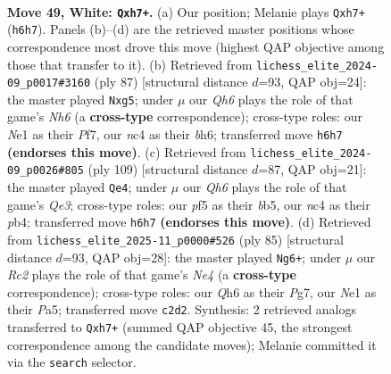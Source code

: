 \documentclass[11pt]{article}
\begin{document}
\clearpage

\begin{figure}[p]\centering
\begin{subfigure}{0.46\textwidth}\centering
\resizebox{\linewidth}{!}{%
\newchessgame
\chessboard[
  setfen={1qb5/r4k1p/4p2Q/p2pPpB1/P1n4P/3p4/2R5/RN2N1K1 w - - 1 49},
  showmover=false,
  pgfstyle=straightmove, color=movearrow, markmove={h6-h7}
]}
\caption{}
\end{subfigure}\hfill
\begin{subfigure}{0.46\textwidth}\centering
\resizebox{\linewidth}{!}{%
\newchessgame
\chessboard[
  setfen={7k/2q2p2/p5rB/1p2R1P1/4Q3/N1P4n/PP3P2/5K2 b - - 4 44},
  showmover=false,
  pgfstyle=straightmove, color=movearrow, markmove={h3-g5}
]}
\caption{}
\end{subfigure}
\\[4pt]
\begin{subfigure}{0.46\textwidth}\centering
\resizebox{\linewidth}{!}{%
\newchessgame
\chessboard[
  setfen={8/6k1/4q3/PBp2b2/1PP2Pp1/3pr1P1/3Q2R1/5K2 b - - 4 55},
  showmover=false,
  pgfstyle=straightmove, color=movearrow, markmove={e6-e4}
]}
\caption{}
\end{subfigure}\hfill
\begin{subfigure}{0.46\textwidth}\centering
\resizebox{\linewidth}{!}{%
\newchessgame
\chessboard[
  setfen={6k1/1R2Kpp1/2p4p/p3n3/4PNP1/2Q1P2P/1P1r3q/8 b - - 14 43},
  showmover=false,
  pgfstyle=straightmove, color=movearrow, markmove={e5-g6}
]}
\caption{}
\end{subfigure}
\caption{\textbf{Move 49, White: \texttt{Qxh7+}.} (a) Our position; Melanie plays \texttt{Qxh7+} (\texttt{h6h7}). Panels (b)--(d) are the retrieved master positions whose correspondence most drove this move (highest QAP objective among those that transfer to it). (b) Retrieved from \texttt{lichess\_elite\_2024-09\_p0017\#3160} (ply 87) [structural distance $d$=93, QAP obj=24]: the master played \texttt{Nxg5}; under $\mu$ our \emph{Qh6} plays the role of that game's \emph{Nh6} (a \textbf{cross-type} correspondence); cross-type roles: our \emph{N}e1 as their \emph{P}f7, our \emph{n}c4 as their \emph{b}h6; transferred move \texttt{h6h7} \textbf{(endorses this move)}. (c) Retrieved from \texttt{lichess\_elite\_2024-09\_p0026\#805} (ply 109) [structural distance $d$=87, QAP obj=21]: the master played \texttt{Qe4}; under $\mu$ our \emph{Qh6} plays the role of that game's \emph{Qe3}; cross-type roles: our \emph{p}f5 as their \emph{b}b5, our \emph{n}c4 as their \emph{p}b4; transferred move \texttt{h6h7} \textbf{(endorses this move)}. (d) Retrieved from \texttt{lichess\_elite\_2025-11\_p0000\#526} (ply 85) [structural distance $d$=93, QAP obj=28]: the master played \texttt{Ng6+}; under $\mu$ our \emph{Rc2} plays the role of that game's \emph{Ne4} (a \textbf{cross-type} correspondence); cross-type roles: our \emph{Q}h6 as their \emph{P}g7, our \emph{N}e1 as their \emph{P}a5; transferred move \texttt{c2d2}. Synthesis: 2 retrieved analogs transferred to \texttt{Qxh7+} (summed QAP objective 45, the strongest correspondence among the candidate moves); Melanie committed it via the \texttt{search} selector.}
\label{fig:thought-m96}
\end{figure}
\end{document}

